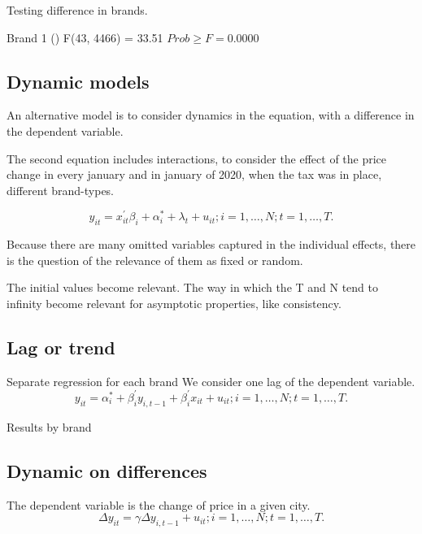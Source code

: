 \documentclass[]{article}
\begin{document}
%

Testing difference in brands.

Brand 1 ()
 F(43, 4466) = 33.51                   
$ Prob \geq F = 0.0000 $

%
 
\subsection{Dynamic models}
An alternative model is to consider dynamics in the equation, with a difference in the dependent variable. 

The second equation includes interactions, to consider the effect of the price change in every january and in january of 2020, when the tax was in place, different brand-types.

\begin{equation*}
	y_{it} = x_{it}^{'} \beta_{i} + \alpha_{i}^{*} + \lambda_{t} + u_{it}; i = 1,\ldots,N; t=1,\ldots,T.
\end{equation*}

Because there are many omitted variables captured in the individual effects, there is the question of the relevance of them as fixed or random.

The initial values become relevant.
The way in which the T and N tend to infinity become relevant for asymptotic properties, like consistency.



\subsection{Lag or trend }
Separate regression for each brand
We consider one lag of the dependent variable.
\begin{equation*}
	y_{it} = \alpha_{i}^{*} + \beta_{i}^{'}y_{i,t-1}  + \beta_{i}^{'}x_{it} + u_{it}; i = 1,\ldots,N; t=1,\ldots,T.
\end{equation*}

Results by brand

\begin{landscape}
	
\end{landscape}

\subsection{Dynamic on differences}
The dependent variable is the change of price in a given city. 
\begin{equation*}
	\Delta y_{it} = \gamma \Delta y_{i,t-1} + u_{it}; i = 1,\ldots,N; t=1,\ldots,T.
\end{equation*}
\end{document}
